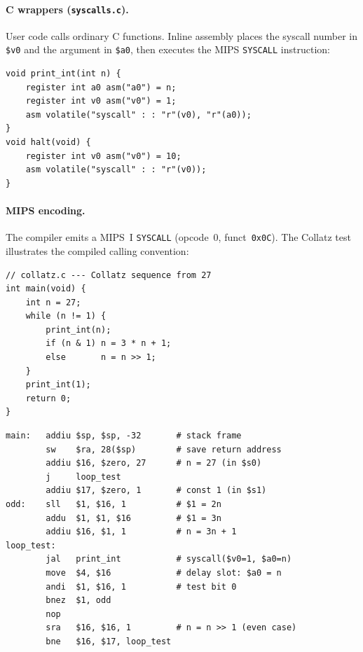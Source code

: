 \documentclass[11pt]{article}
\begin{document}
\paragraph{C wrappers (\texttt{syscalls.c}).}
User code calls ordinary C functions.  Inline assembly places the syscall
number in \texttt{\$v0} and the argument in \texttt{\$a0}, then executes the
MIPS \texttt{SYSCALL} instruction:

\begin{lstlisting}[style=clang,caption={Syscall wrappers in C (using GCC inline assembly)},
  morekeywords={register,asm,volatile}]
void print_int(int n) {
    register int a0 asm("a0") = n;
    register int v0 asm("v0") = 1;
    asm volatile("syscall" : : "r"(v0), "r"(a0));
}
void halt(void) {
    register int v0 asm("v0") = 10;
    asm volatile("syscall" : : "r"(v0));
}
\end{lstlisting}

\paragraph{MIPS encoding.}
The compiler emits a MIPS~I \texttt{SYSCALL} (opcode~0,
funct~\texttt{0x0C}).  The Collatz test illustrates the compiled
calling convention:

\begin{lstlisting}[style=clang,caption={Collatz sequence --- C source}]
// collatz.c --- Collatz sequence from 27
int main(void) {
    int n = 27;
    while (n != 1) {
        print_int(n);
        if (n & 1) n = 3 * n + 1;
        else       n = n >> 1;
    }
    print_int(1);
    return 0;
}
\end{lstlisting}

\begin{lstlisting}[style=asm,caption={Collatz disassembly (selected instructions, \texttt{-O1})}]
main:   addiu $sp, $sp, -32       # stack frame
        sw    $ra, 28($sp)        # save return address
        addiu $16, $zero, 27      # n = 27 (in $s0)
        j     loop_test
        addiu $17, $zero, 1       # const 1 (in $s1)
odd:    sll   $1, $16, 1          # $1 = 2n
        addu  $1, $1, $16         # $1 = 3n
        addiu $16, $1, 1          # n = 3n + 1
loop_test:
        jal   print_int           # syscall($v0=1, $a0=n)
        move  $4, $16             # delay slot: $a0 = n
        andi  $1, $16, 1          # test bit 0
        bnez  $1, odd
        nop
        sra   $16, $16, 1         # n = n >> 1 (even case)
        bne   $16, $17, loop_test
\end{lstlisting}
\end{document}
